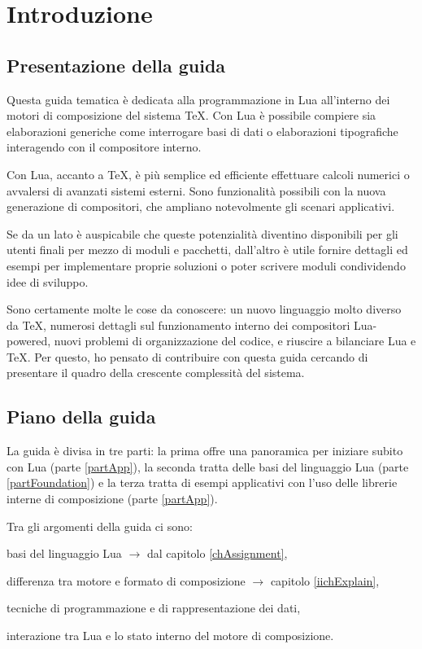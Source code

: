 

\chapter{Introduzione}

\section{Presentazione della guida}

Questa guida tematica è dedicata alla programmazione in Lua all'interno dei
motori di composizione del sistema \TeX. Con Lua è possibile compiere sia
elaborazioni generiche come interrogare basi di dati o elaborazioni tipografiche
interagendo con il compositore interno.

Con Lua, accanto a \TeX, è più semplice ed efficiente effettuare calcoli
numerici o avvalersi di avanzati sistemi esterni. Sono funzionalità possibili
con la nuova generazione di compositori, che ampliano notevolmente gli scenari
applicativi.

Se da un lato è auspicabile che queste potenzialità diventino disponibili per
gli utenti finali per mezzo di moduli e pacchetti, dall'altro è utile fornire
dettagli ed esempi per implementare proprie soluzioni o poter scrivere moduli
condividendo idee di sviluppo.

Sono certamente molte le cose da conoscere: un nuovo linguaggio molto diverso da
\TeX{}, numerosi dettagli sul funzionamento interno dei compositori Lua-powered,
nuovi problemi di organizzazione del codice, e riuscire a bilanciare Lua e \TeX.
Per questo, ho pensato di contribuire con questa guida cercando di presentare il
quadro della crescente complessità del sistema.


\section{Piano della guida}

La guida è divisa in tre parti: la prima offre una panoramica per iniziare
subito con Lua (parte \ref{partApp}), la seconda tratta delle basi del
linguaggio Lua (parte \ref{partFoundation}) e la terza tratta di esempi
applicativi con l'uso delle librerie interne di composizione (parte
\ref{partApp}).

Tra gli argomenti della guida ci sono:
\begin{compactitemize}
\item basi del linguaggio Lua \( \to \) dal capitolo \ref{chAssignment},
\item differenza tra motore e formato di composizione \( \to \) capitolo
\ref{iichExplain},
\item tecniche di programmazione e di rappresentazione dei dati,
\item interazione tra Lua e lo stato interno del motore di composizione.
\end{compactitemize}


